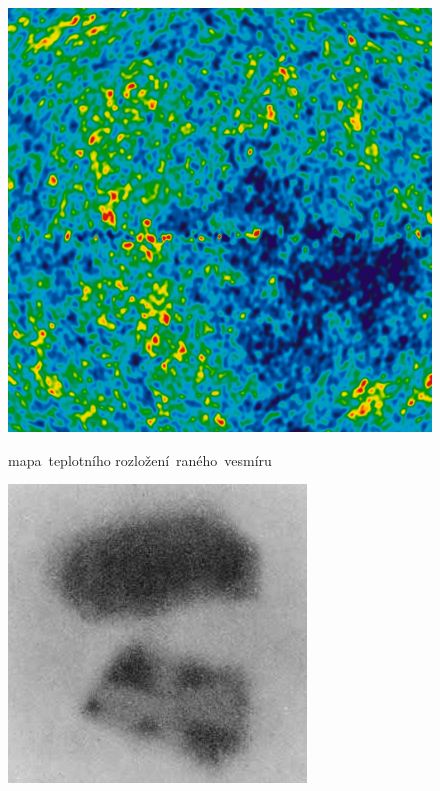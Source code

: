\documentclass{../../../../style/mkimain}
\begin{document}
\begin{figure}[H]
    \includegraphics[width=\linewidth]{images/reliktni-zareni.png}
    \begin{center}
        mapa~teplotního rozložení~raného~vesmíru
      \end{center}
  \endminipage\hfill
    \includegraphics[width=\linewidth]{images/becquerel.jpg}

\end{figure}
\end{document}
